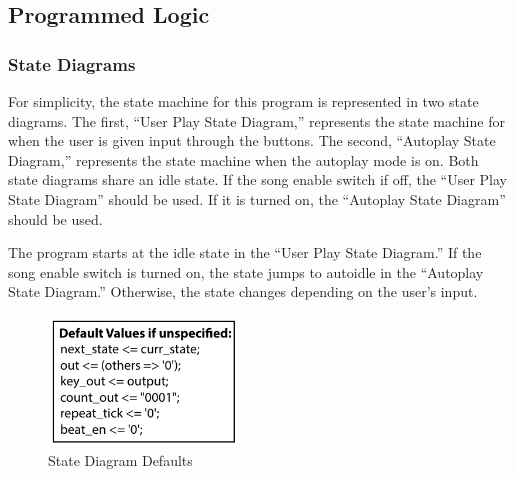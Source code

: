 \documentclass{article}
\begin{document}
    \newpage
	\subsection{Programmed Logic}

	    \subsubsection{State Diagrams}

		    
		    \begin{multicols}{2}
	    		For simplicity, the state machine for this program is represented in two state diagrams. The first, ``User Play State Diagram,'' represents the state machine for when the user is given input through the buttons. The second, ``Autoplay State Diagram,'' represents the state machine when the autoplay mode is on. Both state diagrams share an idle state. If the song enable switch if off, the ``User Play State Diagram'' should be used. If it is turned on, the ``Autoplay State Diagram'' should be used.

	    		The program starts at the idle state in the ``User Play State Diagram.'' If the song enable switch is turned on, the state jumps to autoidle in the ``Autoplay State Diagram.'' Otherwise, the state changes depending on the user's input.

		    \columnbreak
			    \begin{figure}[H]
			      \centering
			      \includegraphics[width=2in]{img/StateDiagramDefaults}
			      \caption{State Diagram Defaults}
			    \end{figure}
		    \end{multicols}
	    
\end{document}
